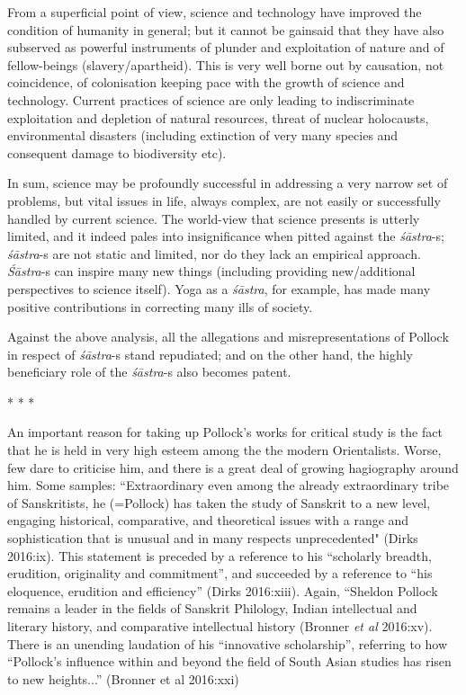 From a superficial point of view, science and technology have improved the condition of humanity in general; but it cannot be gainsaid that they have also subserved as powerful instruments of plunder and exploitation of nature and of fellow-beings (slavery/apartheid). This is very well borne out by causation, not coincidence, of colonisation keeping pace with the growth of science and technology. Current practices of science are only leading to indiscriminate exploitation and depletion of natural resources, threat of nuclear holocausts, environmental disasters (including extinction of very many species and consequent damage to biodiversity etc).

In sum, science may be profoundly successful in addressing a very narrow set of problems, but vital issues in life, always complex, are not easily or successfully handled by current science. The world-view that science presents is utterly limited, and it indeed pales into insignificance when pitted against the \textit{śāstra}-s; \textit{śāstra}-s are not static and limited, nor do they lack an empirical approach. \hbox{\textit{Śāstra}-s} can inspire many new things (including providing new/additional perspectives to science itself). Yoga as a \textit{śāstra}, for example, has made many positive contributions in correcting many ills of society.

Against the above analysis, all the allegations and misrepresentations of Pollock in respect of \textit{śāstra}-s stand repudiated; and on the other hand, the highly beneficiary role of the \textit{śāstra}-s also becomes patent.

\begin{center}
* * *
\end{center}

\vskip -7pt

An important reason for taking up Pollock’s works for critical study is the fact that he is held in very high esteem among the the modern Orientalists. Worse, few dare to criticise him, and there is a great deal of growing hagiography around him. Some samples: “Extraordinary even among the already extraordinary tribe of Sanskritists, he (=Pollock) has taken the study of Sanskrit to a new level, engaging historical, comparative, and theoretical issues with a range and sophistication that is unusual and in many respects unprecedented" (Dirks 2016:ix). This statement is preceded by a reference to his “scholarly breadth, erudition, originality and commitment”, and succeeded by a reference to “his eloquence, erudition and efficiency” (Dirks 2016:xiii). Again, “Sheldon Pollock remains a leader in the fields of Sanskrit Philology, Indian intellectual and literary history, and comparative intellectual history (Bronner \textit{et al} 2016:xv). There is an unending laudation of his ``innovative scholarship'', referring to how ``Pollock’s influence within and beyond the field of South Asian studies has risen to new heights...”  (Bronner et al 2016:xxi)

